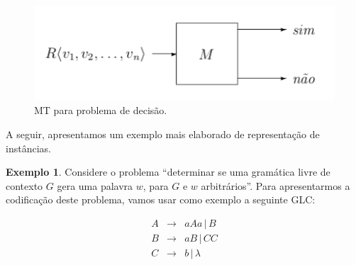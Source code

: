 \documentclass[a4paper]{article}
\theoremstyle{definition}
\newtheorem{Example}{Exemplo}
\begin{document}
  \begin{figure}[!htb]
    \centering
    \includegraphics[scale=.6]{MT1.png}
    \caption{MT para problema de decisão.}
  \end{figure}


  A seguir, apresentamos um exemplo mais elaborado de representação de instâncias.

  \begin{Example}
    Considere o problema ``determinar se uma gramática livre de contexto $G$
    gera uma palavra $w$, para $G$ e $w$ arbitrários''. Para apresentarmos a
    codificação deste problema, vamos usar como exemplo a seguinte GLC:

    \[
      \begin{array}{lcl}
        A & \to & aAa \,|\, B \\
        B & \to & aB \,|\, CC \\
        C & \to & b \,|\,\lambda 
      \end{array}
    \]


\end{Example}
\end{document}
